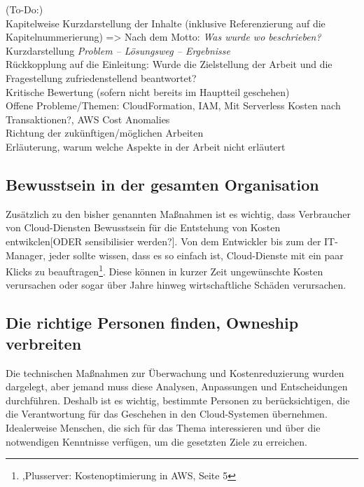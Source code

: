 (To-Do:)
\\Kapitelweise Kurzdarstellung der Inhalte (inklusive Referenzierung auf die \\Kapitelnummerierung) => Nach dem Motto: \textit{Was wurde wo beschrieben?}
\\Kurzdarstellung \textit{Problem – Lösungsweg – Ergebnisse}
\\Rückkopplung auf die Einleitung: Wurde die Zielstellung der Arbeit und die \\Fragestellung zufriedenstellend beantwortet?
\\Kritische Bewertung (sofern nicht bereits im Hauptteil geschehen)
\\Offene Probleme/Themen: CloudFormation, IAM, Mit Serverless Kosten nach Transaktionen?,  AWS Cost Anomalies
\\Richtung der zukünftigen/möglichen Arbeiten
\\Erläuterung, warum welche Aspekte in der Arbeit nicht erläutert 

\subsection*{Bewusstsein in der gesamten Organisation}
Zusätzlich zu den bisher genannten Maßnahmen ist es wichtig, dass Verbraucher von Cloud-Diensten Bewusstsein für die Entstehung von Kosten entwikclen[ODER sensibilisier werden?]. Von dem Entwickler bis zum der IT-Manager, jeder sollte wissen, dass es so einfach ist, Cloud-Dienste mit ein paar Klicks zu beauftragen\footnote{\cite{PS1},Plusserver: Kostenoptimierung in AWS, Seite 5}. Diese können in kurzer Zeit ungewünschte  Kosten verursachen oder sogar über Jahre hinweg wirtschaftliche Schäden verursachen. 
\\
\subsection*{Die richtige Personen finden, Owneship verbreiten}
Die technischen Maßnahmen zur Überwachung und Kostenreduzierung wurden dargelegt, aber jemand muss diese Analysen, Anpassungen und Entscheidungen durchführen. 
Deshalb ist es wichtig, bestimmte Personen zu berücksichtigen, die die Verantwortung für das Geschehen in den Cloud-Systemen übernehmen. Idealerweise Menschen, die sich für das Thema interessieren und über die notwendigen Kenntnisse verfügen, um die gesetzten Ziele zu erreichen. 
\\
